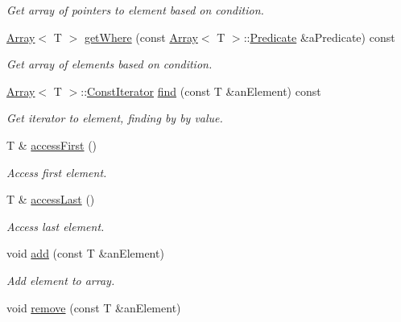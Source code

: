 \begin{DoxyCompactItemize}
\begin{DoxyCompactList}\small\item\em Get array of pointers to element based on condition. \end{DoxyCompactList}\item 
\hyperlink{classlibrary_1_1core_1_1ctnr_1_1Array}{Array}$<$ T $>$ \hyperlink{classlibrary_1_1core_1_1ctnr_1_1Array_a62069b24d593b2265422cb8f3a149c44}{get\+Where} (const \hyperlink{classlibrary_1_1core_1_1ctnr_1_1Array}{Array}$<$ T $>$\+::\hyperlink{classlibrary_1_1core_1_1ctnr_1_1Array_a74cd325a740870aea490b6b739aa06ae}{Predicate} \&a\+Predicate) const
\begin{DoxyCompactList}\small\item\em Get array of elements based on condition. \end{DoxyCompactList}\item 
\hyperlink{classlibrary_1_1core_1_1ctnr_1_1Array}{Array}$<$ T $>$\+::\hyperlink{classlibrary_1_1core_1_1ctnr_1_1Array_ac26454f2a2ad4013873386a70aa25fc4}{Const\+Iterator} \hyperlink{classlibrary_1_1core_1_1ctnr_1_1Array_aeb8ed38b67b6031e27c188d89bd5cbbf}{find} (const T \&an\+Element) const
\begin{DoxyCompactList}\small\item\em Get iterator to element, finding by by value. \end{DoxyCompactList}\item 
T \& \hyperlink{classlibrary_1_1core_1_1ctnr_1_1Array_abb2068e46720e8df057b5410ac8879d5}{access\+First} ()
\begin{DoxyCompactList}\small\item\em Access first element. \end{DoxyCompactList}\item 
T \& \hyperlink{classlibrary_1_1core_1_1ctnr_1_1Array_ad6ea47ab09dfeebd6de0878d3ad2de25}{access\+Last} ()
\begin{DoxyCompactList}\small\item\em Access last element. \end{DoxyCompactList}\item 
void \hyperlink{classlibrary_1_1core_1_1ctnr_1_1Array_a388497f6bda07f69d61aa60099b991a8}{add} (const T \&an\+Element)
\begin{DoxyCompactList}\small\item\em Add element to array. \end{DoxyCompactList}\item 
void \hyperlink{classlibrary_1_1core_1_1ctnr_1_1Array_a8e295703797d6e41dad7a45e4101a6db}{remove} (const T \&an\+Element)

\end{DoxyCompactItemize}
